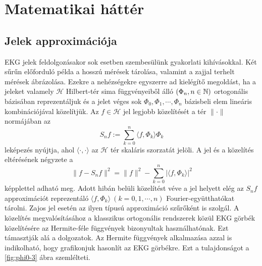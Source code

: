 \documentclass[oneside,titlepage,12pt,a4paper]{report}
\begin{document}
\section{Matematikai háttér}
\subsection{Jelek approximációja}

EKG jelek feldolgozásakor sok esetben szembesülünk gyakorlati kihívásokkal. Két sűrűn előforduló példa a hosszú mérések tárolása, valamint a zajjal terhelt mérések ábrázolása. Ezekre a nehézségekre egyszerre ad kielégítő megoldást, ha a jeleket  valamely $\mathcal H$ Hilbert-tér sima függvényeiből álló $(\Phi_n, n\in\Bbb N)$ ortogonális bázisában reprezentáljuk és a jelet véges sok $\Phi_0,\Phi_1,\cdots,\Phi_n$ bázisbeli elem lineáris kombinációjával közelítjük. Az $f\in\mathcal H$ jel
legjobb közelítését a tér $\|\cdot\|$ normájában az
$$
S_nf:=\sum_{k=0}^n\langle f,\Phi_k\rangle \Phi_k
$$
leképezés nyújtja, ahol $\langle\cdot,\cdot\rangle$ az $\mathcal  H$ tér
skaláris szorzatát jelöli. A jel és a közelítés eltérésének négyzete  a
$$
\|f-S_nf\|^2=\|f\|^2-\sum_{k=0}^n|\langle f,\Phi_k\rangle|^2
$$
képplettel adható meg. Adott hibán belüli közelítést véve a jel helyett  elég az
$S_nf$ approximációt reprezentáló  $\langle f,\Phi_k\rangle\ (k=0,1,\cdots, n)$ Fourier-együtthatókat tárolni.  Zajos jel esetén az ilyen típusú approximáció szűrőként is szolgál.  A közelítés megvalósításához a klasszikus ortogonális rendszerek közül  EKG görbék közelítésére  az Hermite-féle függvények bizonyultak használhatónak. Ezt támasztják alá a \cite{origCikk, kvadCikk} dolgozatok. Az  Hermite függvények alkalmazása azzal is indikolható, hogy grafikonjuk hasonlít az EKG görbékre. Ezt a tulajdonságot a \ref{fig:phi0-3} ábra szemlélteti.
\end{document}

